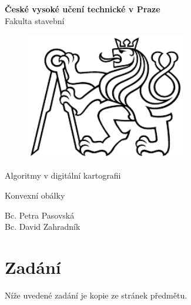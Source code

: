 \documentclass[a4paper, 12pt]{article}
\begin{document}
\begin{titlepage}
\begin{center}
\noindent
\Large \textbf{České vysoké učení technické v Praze }\\ Fakulta stavební
\vspace{5cm}

\huge

\begin{figure}[h!]
	\centering
	\includegraphics[width=7cm]{logo.png}
\end{figure}

\vspace{0.5cm}

Algoritmy v digitální kartografii \\

\vspace{3cm}

\Huge  
Konvexní obálky\\

\vspace{2cm}

\Large
Bc. Petra Pasovská \\
Bc. David Zahradník \\

\end{center}

\end{titlepage}




\pagestyle{plain}     %
\setcounter{page}{1}  %

\tableofcontents
\newpage

\section{Zadání}
Níže uvedené zadání je kopie ze stránek předmětu. 
\end{document}

